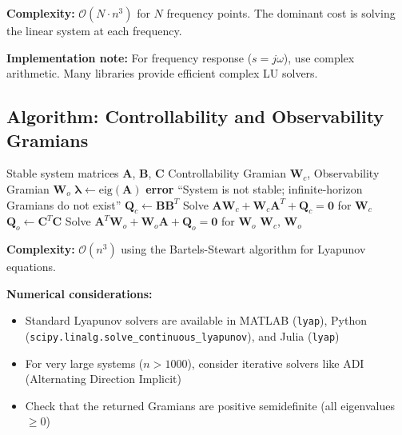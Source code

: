 \textbf{Complexity:} $\mathcal{O}(N \cdot n^3)$ for $N$ frequency points. The dominant cost is solving the linear system at each frequency.

\textbf{Implementation note:} For frequency response ($s = j\omega$), use complex arithmetic. Many libraries provide efficient complex LU solvers.


\subsection{Algorithm: Controllability and Observability Gramians}

\begin{algorithm}[H]
\caption{Gramian Computation via Lyapunov Equation}
\label{alg:gramians}
\begin{algorithmic}[1]
\REQUIRE Stable system matrices $\mathbf{A}$, $\mathbf{B}$, $\mathbf{C}$
\ENSURE Controllability Gramian $\mathbf{W}_c$, Observability Gramian $\mathbf{W}_o$
\STATE
{}
\STATE $\boldsymbol{\lambda} \gets \text{eig}(\mathbf{A})$
    \STATE \textbf{error} ``System is not stable; infinite-horizon Gramians do not exist''
\ENDIF
\STATE
{}
\STATE $\mathbf{Q}_c \gets \mathbf{B}\mathbf{B}^T$
\STATE Solve $\mathbf{A}\mathbf{W}_c + \mathbf{W}_c\mathbf{A}^T + \mathbf{Q}_c = \mathbf{0}$ for $\mathbf{W}_c$ 
\STATE
{}
\STATE $\mathbf{Q}_o \gets \mathbf{C}^T\mathbf{C}$
\STATE Solve $\mathbf{A}^T\mathbf{W}_o + \mathbf{W}_o\mathbf{A} + \mathbf{Q}_o = \mathbf{0}$ for $\mathbf{W}_o$
\STATE
\RETURN $\mathbf{W}_c$, $\mathbf{W}_o$
\end{algorithmic}
\end{algorithm}

\textbf{Complexity:} $\mathcal{O}(n^3)$ using the Bartels-Stewart algorithm for Lyapunov equations.

\textbf{Numerical considerations:}
\begin{itemize}
\item Standard Lyapunov solvers are available in MATLAB (\texttt{lyap}), Python (\texttt{scipy.linalg.solve\_continuous\_lyapunov}), and Julia (\texttt{lyap})
\item For very large systems ($n > 1000$), consider iterative solvers like ADI (Alternating Direction Implicit)
\item Check that the returned Gramians are positive semidefinite (all eigenvalues $\geq 0$)
\end{itemize}


